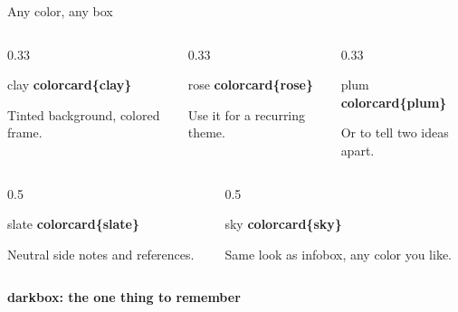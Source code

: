 \documentclass[aspectratio=169,12pt,t]{beamer}
\begin{document}
\begin{frame}{Any color, any box}
  \begin{columns}[T,onlytextwidth]
    \begin{column}{0.33\textwidth}
      \begin{colorcard}{clay}
        {\bfseries\color{clay}colorcard\{clay\}}\par\smallskip\small
        Tinted background, colored frame.
      \end{colorcard}
    \end{column}
    \begin{column}{0.33\textwidth}
      \begin{colorcard}{rose}
        {\bfseries\color{rose}colorcard\{rose\}}\par\smallskip\small
        Use it for a recurring theme.
      \end{colorcard}
    \end{column}
    \begin{column}{0.33\textwidth}
      \begin{colorcard}{plum}
        {\bfseries\color{plum}colorcard\{plum\}}\par\smallskip\small
        Or to tell two ideas apart.
      \end{colorcard}
    \end{column}
  \end{columns}
  \vspace{0.3cm}
  \begin{columns}[T,onlytextwidth]
    \begin{column}{0.5\textwidth}
      \begin{colorcard}{slate}
        {\bfseries\color{slate}colorcard\{slate\}}\par\smallskip\small
        Neutral side notes and references.
      \end{colorcard}
    \end{column}
    \begin{column}{0.5\textwidth}
      \begin{colorcard}{sky}
        {\bfseries\color{sky}colorcard\{sky\}}\par\smallskip\small
        Same look as infobox, any color you like.
      \end{colorcard}
    \end{column}
  \end{columns}
  \vspace{0.35cm}
  \begin{darkbox}
    {\bfseries darkbox: the one thing to remember}
  \end{darkbox}
\end{frame}
\end{document}
